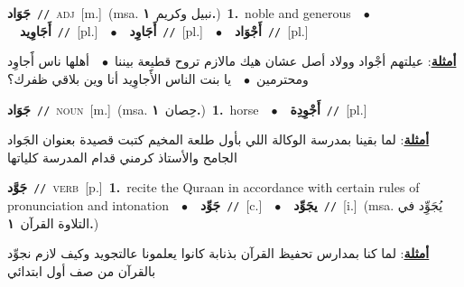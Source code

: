 \documentclass[10pt,a4paper,twoside]{article} %
\begin{document}
\begin{multicols}{2}
{\setlength\topsep{0pt}\textbf{\foreignlanguage{arabic}{جَوَاد}}\ {\color{gray}\texttt{//}\color{black}}\ \textsc{adj}\ [m.]\ \color{gray}(msa. \foreignlanguage{arabic}{نبيل وكريم}~\foreignlanguage{arabic}{\textbf{١.}})\color{black}\ \textbf{1.}~noble and generous\ \ $\bullet$\ \ \setlength\topsep{0pt}\textbf{\foreignlanguage{arabic}{أَجَاوِيد}}\ {\color{gray}\texttt{//}\color{black}}\ [pl.]\ \ $\bullet$\ \ \setlength\topsep{0pt}\textbf{\foreignlanguage{arabic}{أَجَاوِد}}\ {\color{gray}\texttt{//}\color{black}}\ [pl.]\ \ $\bullet$\ \ \setlength\topsep{0pt}\textbf{\foreignlanguage{arabic}{أَجْوَاد}}\ {\color{gray}\texttt{//}\color{black}}\ [pl.]\  \begin{flushright}\color{gray}\foreignlanguage{arabic}{\textbf{\underline{\foreignlanguage{arabic}{أمثلة}}}: عيلتهم أجْواد وولاد أصل عشان هيك مالازم تروح قطيعة بيننا\ $\bullet$\ \  أهلها ناس أََجاوِد ومحترمين\ $\bullet$\ \  يا بنت الناس الأََجاوِيد أنا وين بلاقي ظفرك؟}\end{flushright}\color{black}} \vspace{2mm}

{\setlength\topsep{0pt}\textbf{\foreignlanguage{arabic}{جَوَاد}}\ {\color{gray}\texttt{//}\color{black}}\ \textsc{noun}\ [m.]\ \color{gray}(msa. \foreignlanguage{arabic}{حِصان}~\foreignlanguage{arabic}{\textbf{١.}})\color{black}\ \textbf{1.}~horse\ \ $\bullet$\ \ \setlength\topsep{0pt}\textbf{\foreignlanguage{arabic}{أَجْوِدِة}}\ {\color{gray}\texttt{//}\color{black}}\ [pl.]\  \begin{flushright}\color{gray}\foreignlanguage{arabic}{\textbf{\underline{\foreignlanguage{arabic}{أمثلة}}}: لما بقينا بمدرسة الوكالة اللي بأول طلعة المخيم كتبت قصيدة  بعنوان الجَواد الجامح والأستاذ كرمني قدام المدرسة كلياتها}\end{flushright}\color{black}} \vspace{2mm}

{\setlength\topsep{0pt}\textbf{\foreignlanguage{arabic}{جَوَّد}}\ {\color{gray}\texttt{//}\color{black}}\ \textsc{verb}\ [p.]\ \textbf{1.}~recite the Quraan in accordance with certain rules of pronunciation and intonation\ \ $\bullet$\ \ \setlength\topsep{0pt}\textbf{\foreignlanguage{arabic}{جَوِّد}}\ {\color{gray}\texttt{//}\color{black}}\ [c.]\ \ $\bullet$\ \ \setlength\topsep{0pt}\textbf{\foreignlanguage{arabic}{يجَوِّد}}\ {\color{gray}\texttt{//}\color{black}}\ [i.]\ \color{gray}(msa. \foreignlanguage{arabic}{يُجَوِِّد في التلاوة القرآن}~\foreignlanguage{arabic}{\textbf{١.}})\color{black}\  \begin{flushright}\color{gray}\foreignlanguage{arabic}{\textbf{\underline{\foreignlanguage{arabic}{أمثلة}}}: لما كنا بمدارس تحفيظ القرآن بذنابة كانوا يعلمونا عالتجويد وكيف لازم نجوِّد بالقرآن من صف أول ابتدائي}\end{flushright}\color{black}} \vspace{2mm}


\end{multicols}
\end{document}
